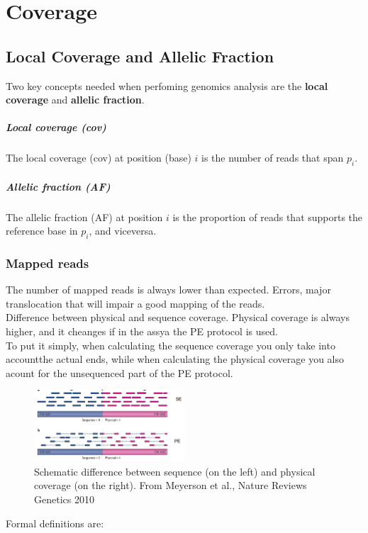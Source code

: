 \graphicspath{{chapters/02/}}
\chapter{Coverage}
\section{Local Coverage and Allelic Fraction}
Two key concepts needed when perfoming genomics analysis are the \textbf{local coverage} and \textbf{allelic fraction}.

	\paragraph{Local coverage (cov)}
		The local coverage (cov) at position (base) $i$ is the number of reads that span $p_i$.
	\paragraph{Allelic fraction (AF)}
		The allelic fraction (AF) at position $i$ is the proportion of reads that supports 			the reference base in $p_i$, and viceversa. 
		
\subsection{Mapped reads}
The number of mapped reads is always lower than expected. Errors, major translocation that will impair a good mapping of the reads. \\
Difference between physical and sequence coverage. Physical coverage is always higher, and it cheanges if in the assya the PE protocol is used. \\
To put it simply, when calculating the sequence coverage you only take into accountthe actual ends, while when calculating the physical coverage you also acount for the unsequenced part of the PE protocol. 
\begin{figure}[htbp!]
    \centering
    \includegraphics[width=0.5\textwidth]{seq_phys.png}
    \caption{Schematic difference between sequence (on the left) and physical coverage (on the right). From Meyerson et al., Nature Reviews Genetics 2010}
    \label{fig:seq_phys}
\end{figure}Formal definitions are:

